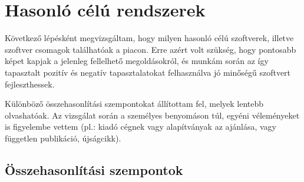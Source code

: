 \documentclass[a4paper,12pt,oneside]{report}
\begin{document}
\section{Hasonló célú rendszerek}
Következő lépésként megvizsgáltam, hogy milyen hasonló célú szoftverek, illetve szoftver csomagok találhatóak a piacon. Erre azért volt szükség, hogy pontosabb képet kapjak a jelenleg fellelhető megoldásokról, és munkám során az így tapasztalt pozitív és negatív tapasztalatokat felhasználva jó minőségű szoftvert fejleszthessek.

Különböző összehasonlítási szempontokat állítottam fel, melyek lentebb olvashatóak. Az vizsgálat során a személyes benyomáson túl, egyéni véleményeket is figyelembe vettem (pl.: kiadó cégnek vagy alapítványak az ajánlása, vagy független publikáció, újságcikk).
\subsection{Összehasonlítási szempontok}
\end{document}

